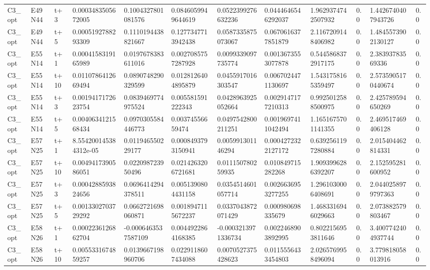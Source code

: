 \begin{landscape}
\begin{longtable}{llllllllllll}
C3\_opt & E49N44 & t+3 & 0.0003483505672005 & 0.1004327801081576 & 0.0846059949644619 & 0.0522399276632236 & 0.0444646546292037 & 1.9629374742507932 & 0.0 & 1.4426740407943726 & 0.0 \\
C3\_opt & E49N44 & t+5 & 0.0005192788293309 & 0.1110194438821667 & 0.1277347713942438 & 0.0587335875073067 & 0.0670616377851879 & 2.1167209148406982 & 0.0 & 1.4845573902130127 & 0.0 \\
C3\_opt & E55N14 & t+1 & 0.0004158319165989 & 0.0197678383611016 & 0.0027085757287928 & 0.0099339097735774 & 0.0013673553077878 & 0.5445868372917175 & 0.0 & 2.38393783569336 & 0.0 \\
C3\_opt & E55N14 & t+10 & 0.0110786412669494 & 0.0890748290329599 & 0.0128126404895879 & 0.0455917016303547 & 0.0067024471130697 & 1.5431758165359497 & 0.0 & 2.5735905170440674 & 0.0 \\
C3\_opt & E55N14 & t+3 & 0.0019417172623754 & 0.0839469774975524 & 0.005581591222343 & 0.0428963925052664 & 0.0029147177210313 & 0.9925012588500975 & 0.0 & 2.425789594650269 & 0.0 \\
C3\_opt & E55N14 & t+5 & 0.0040634121568434 & 0.0970305584446773 & 0.00374556659474 & 0.0497542800211251 & 0.0019697411042494 & 1.1651675701141355 & 0.0 & 2.469517469406128 & 0.0 \\
C3\_opt & E57N25 & t+1 & 8.554200145384312e-05 & 0.011946550229177 & 0.0008493793150941 & 0.005991301146294 & 0.0004272322127172 & 0.6392561197280884 & 0.0 & 2.015404462814331 & 0.0 \\
C3\_opt & E57N25 & t+10 & 0.0049417390586051 & 0.022098723950496 & 0.0214263206721681 & 0.011150780259935 & 0.010849715282268 & 1.9093996286392207 & 0.0 & 2.152595281600952 & 0.0 \\
C3\_opt & E57N25 & t+3 & 0.0004288593824656 & 0.0696414294378511 & 0.0051390804431158 & 0.0354514601057714 & 0.0026636953277255 & 1.2961030006408691 & 0.0 & 2.0440258979797363 & 0.0 \\
C3\_opt & E57N25 & t+5 & 0.0013302703729292 & 0.0662721698060871 & 0.0018947115672237 & 0.0337043872071429 & 0.000980698335679 & 1.4683316946029663 & 0.0 & 2.073882579803467 & 0.0 \\
C3\_opt & E58N26 & t+1 & 0.0002236126862704 & -0.0006463537587109 & 0.0044922864168385 & -0.0003213971336734 & 0.0022468903892995 & 0.8022156953811646 & 0.0 & 3.4007742404937744 & 0.0 \\
C3\_opt & E58N26 & t+10 & 0.0055331674859257 & 0.0139667198960706 & 0.0229118607434088 & 0.0070527375428623 & 0.0115556433454803 & 2.0265769958496094 & 0.0 & 3.779818058013916 & 0.0 \\

\end{longtable}
\end{landscape}
